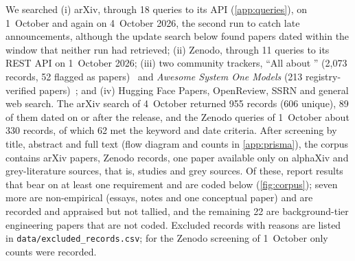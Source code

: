 We searched
(i) arXiv, through 18 queries to its API (\cref{app:queries}), on 1~October and again on 4~October 2026, the second run to catch late announcements, although the update search below found papers dated within the window that neither run had retrieved;
(ii) Zenodo, through 11 queries to its REST API on 1~October 2026;
(iii) two community trackers, ``All about \jev{}'' (2{,}073 records, 52 flagged as papers)~\cite{xiao2026allaboutjev} and \emph{Awesome System One Models} (213 registry-verified papers)~\cite{rafe2026awesome}; and
(iv) Hugging Face Papers, OpenReview, SSRN and general web search.
The arXiv search of 4~October returned 955 records (606 unique), 89 of them dated on or after the release, and the Zenodo queries of 1~October about 330 records, of which 62 met the keyword and date criteria. After screening by title, abstract and full text (flow diagram and counts in \cref{app:prisma}), the corpus contains \nArxiv{} arXiv papers, \nZenodo{} Zenodo records, one paper available only on alphaXiv and \nGrey{} grey-literature sources, that is, \nPapers{} studies and \nGrey{} grey sources.
Of these, \nCoded{} report results that bear on at least one requirement and are coded below (\cref{fig:corpus}); seven more are non-empirical (essays, notes and one conceptual paper) and are recorded and appraised but not tallied, and the remaining 22 are background-tier engineering papers that are not coded.
Excluded records with reasons are listed in \nolinkurl{data/excluded_records.csv}; for the Zenodo screening of 1~October only counts were recorded.

